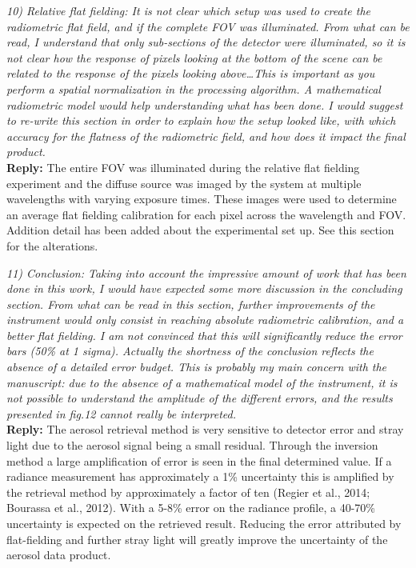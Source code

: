 \documentclass[12pt, notitlepage]{article}
\begin{document}
\textit{10) Relative flat fielding: It is not clear which setup was used to create the radiometric
flat field, and if the complete FOV was illuminated. From what can be read, I understand
that only sub-sections of the detector were illuminated, so it is not clear how the
response of pixels looking at the bottom of the scene can be related to the response of
the pixels looking above\ldots This is important as you perform a spatial normalization in
the processing algorithm. A mathematical radiometric model would help understanding
what has been done. I would suggest to re-write this section in order to explain how
the setup looked like, with which accuracy for the flatness of the radiometric field, and
how does it impact the final product.}\\

\textbf{Reply:} The entire FOV was illuminated during the relative flat fielding experiment and the diffuse source was imaged by the system at multiple wavelengths with varying exposure times. These images were used to determine an average flat fielding calibration for each pixel across the wavelength and FOV. Addition detail has been added about the experimental set up. See this section for the alterations.

\hrulefill

\textit{11) Conclusion: Taking into account the impressive amount of work that has been done
in this work, I would have expected some more discussion in the concluding section.
From what can be read in this section, further improvements of the instrument would
only consist in reaching absolute radiometric calibration, and a better flat fielding. I am
not convinced that this will significantly reduce the error bars (50\% at 1 sigma). Actually
the shortness of the conclusion reflects the absence of a detailed error budget. This is
probably my main concern with the manuscript: due to the absence of a mathematical
model of the instrument, it is not possible to understand the amplitude of the different
errors, and the results presented in fig.12 cannot really be interpreted.}\\

\textbf{Reply:} The aerosol retrieval method is very sensitive to detector error and stray light due to the aerosol signal being a small residual. Through the inversion method a large amplification of error is seen in the final determined value. If a radiance measurement has approximately a 1\% uncertainty this is amplified by the retrieval method by approximately a factor of ten (Regier et al., 2014; Bourassa et al., 2012). With a 5-8\% error on the radiance profile, a 40-70\% uncertainty is expected on the retrieved result. Reducing the error attributed by flat-fielding and further stray light will greatly improve the uncertainty of the aerosol data product.
\end{document}
